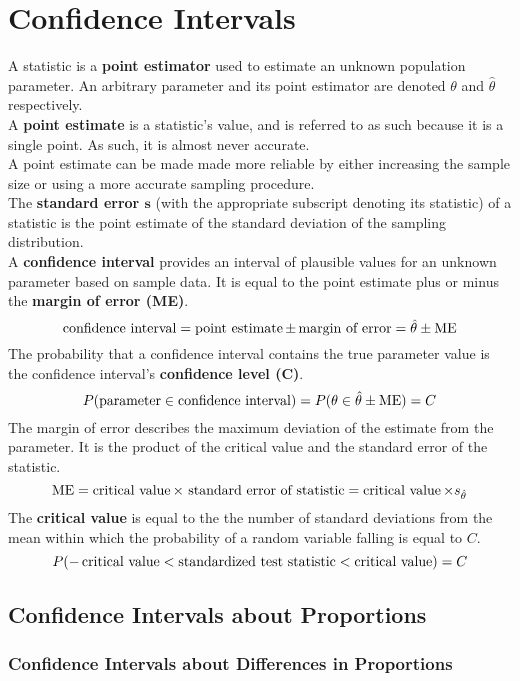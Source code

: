 \documentclass[../AP_Statistics.tex]{subfiles}
\begin{document}
	\chapter{Confidence Intervals}
		A statistic is a \textbf{point estimator} used to estimate an unknown population parameter. An arbitrary parameter and its point estimator are denoted $\theta$ and $\hat{\theta}$ respectively. \\
		A \textbf{point estimate} is a statistic's value, and is referred to as such because it is a single point. As such, it is almost never accurate. \\
		A point estimate can be made made more reliable by either increasing the sample size or using a more accurate sampling procedure. \\
		The \textbf{standard error $\bm{s}$} (with the appropriate subscript denoting its statistic) of a statistic is the point estimate of the standard deviation of the sampling distribution. \\
		A \textbf{confidence interval} provides an interval of plausible values for an unknown parameter based on sample data. It is equal to the point estimate plus or minus the \textbf{margin of error (ME)}.
		\[\text{confidence interval} = \operatorname{\text{point estimate}} \pm \operatorname{\text{margin of error}} = \hat{\theta} \pm \operatorname{ME}\]
		The probability that a confidence interval contains the true parameter value is the confidence interval's \textbf{confidence level ($\bm{C}$)}.
		\[P(\operatorname{parameter} \in \text{confidence interval}) = P(\theta \in \hat{\theta} \pm \operatorname{ME}) = C\]
		The margin of error describes the maximum deviation of the estimate from the parameter. It is the product of the critical value and the standard error of the statistic.
		\[\operatorname{ME} = \operatorname{\text{critical value}} \times \text{ standard error of statistic} = \operatorname{\text{critical value}}  \times s_{\hat{\theta}}\]
		The \textbf{critical value} is equal to the the number of standard deviations from the mean within which the probability of a random variable falling is equal to $C$.
		\[P(-\operatorname{\text{critical value}} < \operatorname{\text{standardized test statistic}}< \operatorname{\text{critical value}}) = C\]
		\section{Confidence Intervals about Proportions}
			\subsection*{Confidence Intervals about Differences in Proportions}
\end{document}
